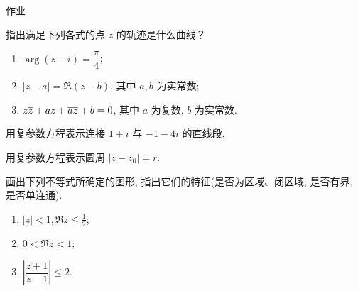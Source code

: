 {
\homework
\begin{frame}[<*>]{作业}
	\begin{homeworks}
		\item 指出满足下列各式的点 $z$ 的轨迹是什么曲线？
		\begin{enumerate}
			\item $\arg(z-i)=\dfrac\pi4$;
			\item $|z-a|=\Re(z-b)$, 其中 $a,b$ 为实常数;
			\item $z\overline z+az+\overline{az}+b=0$, 其中 $a$ 为复数, $b$ 为实常数.
		\end{enumerate}
		\item 用复参数方程表示连接 $1+i$ 与 $-1-4i$ 的直线段.
		\item 用复参数方程表示圆周 $|z-z_0|=r$.
		\item 画出下列不等式所确定的图形, 指出它们的特征(是否为区域、闭区域, 是否有界, 是否单连通).
		\begin{enumerate}
			\item $|z|<1,\Re z\le \frac12$;
			\item $0<\Re z<1$;
			\item $\left|\dfrac{z+1}{z-1}\right|\le 2$.
		\end{enumerate}
	\end{homeworks}
\end{frame}
}